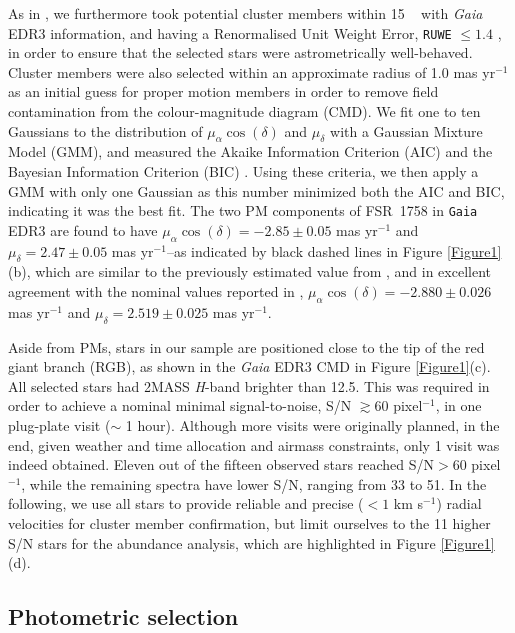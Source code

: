 \documentclass[longauth]{aa} %
\begin{document}
As in \citet{Villanova2019}, we furthermore took potential cluster members within 15 \arcmin ~ with \textit{Gaia} EDR3 information, and having a Renormalised Unit Weight Error, \texttt{RUWE} $\leq1.4$ \citep{Lindegren2018}, in order to ensure that the selected stars were astrometrically well-behaved. Cluster members were also selected within an approximate radius of 1.0 mas yr$^{-1}$ as an initial guess for proper motion members in order to  remove field contamination from the colour-magnitude diagram (CMD). We fit one to ten Gaussians to the distribution of $\mu_{\alpha}\cos(\delta)$ and $\mu_{\delta}$ with a Gaussian Mixture Model (GMM), and measured the Akaike Information Criterion (AIC) \citep{Akaike1974} and the Bayesian Information Criterion (BIC) \citep{Schwarz1978}. Using these criteria, we then apply a GMM with only one Gaussian as this number minimized both the AIC and BIC, indicating it was the best fit. The two PM components of FSR~1758 in \texttt{Gaia} EDR3 are found to have $\mu_{\alpha}\cos(\delta)=-2.85\pm0.05$ mas yr$^{-1}$ and $\mu_{\delta}=2.47\pm0.05$ mas yr$^{-1}$--as indicated by black dashed lines in Figure \ref{Figure1}(b), which are similar to the previously estimated value from \citet[][]{Villanova2019}, and in excellent agreement with the nominal values reported in \citet{Vasiliev2021}, $\mu_{\alpha}\cos(\delta)=-2.880\pm0.026$ mas yr$^{-1}$ and $\mu_{\delta}=2.519\pm0.025$ mas yr$^{-1}$. 

Aside from PMs, stars in our sample are positioned close to the tip of the red giant branch (RGB), as shown in the \textit{Gaia} EDR3 CMD in Figure \ref{Figure1}(c). All selected stars had 2MASS \textit{H}-band  brighter than 12.5. This was required in order to achieve a nominal minimal signal-to-noise, S/N $\gtrsim$60 pixel$^{-1}$, in one plug-plate visit ($\sim$ 1 hour). Although more visits were originally planned, in the end, given weather and time allocation and airmass constraints, only 1 visit was indeed obtained. Eleven out of  the fifteen observed stars reached S/N$>60$ pixel$^{-1}$, while the remaining spectra have lower S/N, ranging from 33  to 51. In the following, we use all stars to provide reliable and precise ($< 1$ km s$^{-1}$) radial velocities for cluster member confirmation, but limit ourselves to the 11 higher S/N stars for the abundance analysis, which are highlighted in Figure \ref{Figure1}(d).

\subsection{Photometric selection}
\end{document}
